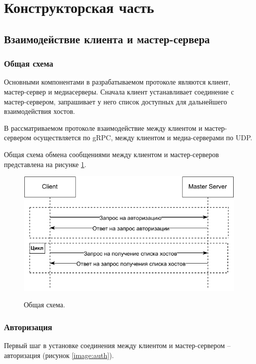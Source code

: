\section{Конструкторская часть}
\subsection{Взаимодействие клиента и мастер-сервера}
\subsubsection{Общая схема}
Основными компонентами в разрабатываемом протоколе являются клиент, мастер-сервер и медиасерверы. Сначала клиент устанавливает соединение с мастер-сервером, запрашивает у него список доступных для дальнейшего взаимодействия хостов.

В рассматриваемом протоколе взаимодействие между клиентом и мастер-сервером осуществляется по gRPC, между клиентом и медиа-серверами по UDP.

Общая схема обмена сообщениями между клиентом и мастер-серверов представлена на рисунке \ref{image:general}. 

\begin{figure}[h!]
	\begin{center}
		{\includegraphics[scale = 1]{img/[general][master].pdf}}
		\caption{Общая схема.}
		\label{image:general}
	\end{center}
\end{figure}

\subsubsection{Авторизация}
Первый шаг в установке соединения между клиентом и мастер-сервером -- авторизация (рисунок \ref{image:auth}). 

